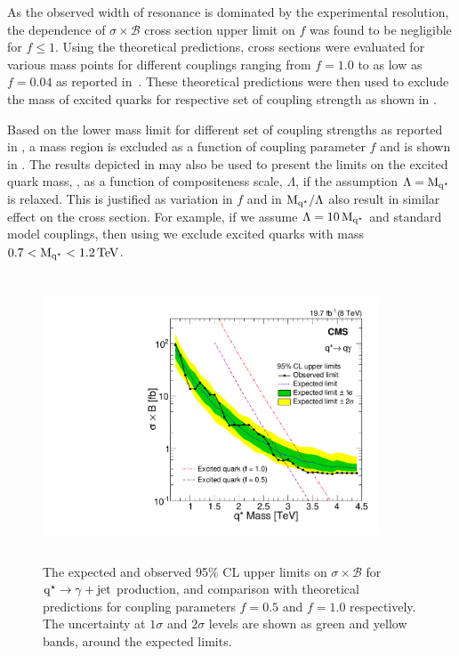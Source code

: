 As the observed width of \qstar resonance is dominated by the experimental resolution, the dependence of $\sigma\times\mathcal{B}$ cross section
upper limit on $f$ was found to be negligible for $f\le1$. Using the theoretical predictions, cross sections were evaluated for various \qstar mass
 points for different couplings ranging from $f=1.0$ to as low as $f=0.04$ as reported in~\tab{\ref{Table:AllfXS}}. These theoretical predictions 
were then used to exclude the mass of excited quarks for respective set of coupling strength as shown in \fig{\ref{fig:LimitAllCouplings}}.
%


Based on the lower mass limit for different set of coupling strengths as reported in \fig{\ref{fig:LimitAllCouplings}}, a mass region is excluded 
as a function of coupling parameter $f$ and is shown in \fig{\ref{fig:LimitMassCoupling}}. The results depicted in \fig{\ref{fig:LimitMassCoupling}} 
may also be used to present the limits on the excited quark mass, \mqstar, as a function of compositeness scale, $\Lambda$, if the assumption
$\Lambda=\mathrm{M_{q^\star}}$ is relaxed. This is justified as variation in $f$ and in $\mathrm{M_{q^\star}}/\Lambda$ also result in similar effect on the \qstar cross 
section. For example, if we assume $\Lambda=10\,\mathrm{M_{q^\star}}$ and standard model couplings, then using \fig{\ref{fig:LimitMassCoupling}} we exclude
excited quarks with mass $0.7<\mathrm{M_{q^\star}}<1.2\mathrm{\,TeV}$.
\begin{figure}[h!]
\centering
 \includegraphics[width=10cm,height=8.5cm]{ch6/plots/ExcitedQuarksToGJ_fullfhalf_ObseExp_xs_Limits_paper_fb_v3.pdf} %
 \caption{The expected and observed 95\% CL upper limits on $\sigma\times\mathcal{B}$ for $\mathrm{q^\star}\to\gamma+\mathrm{jet}$ production, and comparison with 
          theoretical predictions for coupling parameters $f=0.5$ and $f=1.0$ respectively. The uncertainty at $1\sigma$ and $2\sigma$ levels 
          are shown as green and yellow bands, around the expected limits.  }
 \label{fig:LimitsfullHalf}
\end{figure}

